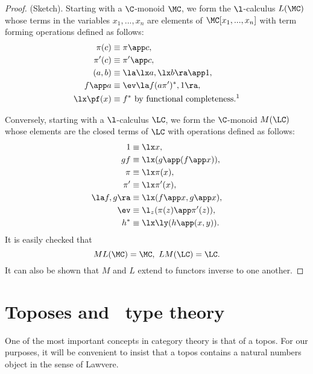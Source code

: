 \begin{proof}
(Sketch). Starting with a $\C$-monoid $\MC$, we form the $\l$-calculus
$L(\MC)$ whose terms in the variables $x_1, ... , x_n$ are elements of $\MC[x_1,...,x_n]$
with term forming operations defined as follows:
\begin{align*}
\pi(c) & \equiv \pi \app c,\\
\pi' (c) & \equiv \pi' \app c,\\
(a,b) & \equiv \la \lx a, \lx b\ra \app 1,\\
f \app a & \equiv \ev \la f(a \pi')^*,1 \ra,\\
\lx \pf(x) &\equiv f^* \,\, \text{by functional completeness.%
\footnotemark}
\end{align*}

Conversely, starting with a $\l$-calculus $\LC$, we form the $\C$-monoid $M(\LC)$
whose elements are the closed terms of $\LC$ with operations defined as follows:
\begin{align*}
1 &\equiv \lx x,\\
gf &\equiv \lx (g\app (f\app x)),\\
\pi & \equiv \lx \pi(x),\\
\pi' & \equiv \lx \pi'(x),\\
\la f,g \ra &\equiv \lx (f\app x, g \app x),\\
\ev & \equiv \l_z (\pi(z) \app \pi'(z)),\\
h^* & \equiv \lx\ly(h \app (x,y)).
\end{align*}
It is easily checked that
\[
ML(\MC) = \MC, \,\, LM(\LC) = \LC.
\]
It can also be shown that $M$ and $L$ extend to functors inverse to one
another.
\end{proof}

\section{Toposes and \intui\ type theory}

One of the most important concepts in category theory is that of a topos.
For our purposes, it will be convenient to insist that a topos contains a
natural numbers object in the sense of Lawvere.

